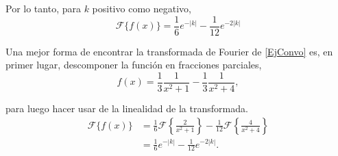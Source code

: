 \begin{ejemplo}
Por lo tanto, para $k$ positivo como negativo,
$$\boxed{\mathcal{F}\{f(x)\} =  \frac{1}{6} e^{-|k|} - \frac{1}{12} e^{-2|k|}} $$

Una mejor forma de encontrar la transformada de Fourier de \eqref{EjConvo} es, en primer lugar, descomponer la función en fracciones parciales,
$$f(x) = \frac{1}{3} \frac{1}{x^2+1} - \frac{1}{3} \frac{1}{x^2+4},$$

para luego hacer usar de la linealidad de la transformada.
\begin{align*}
     \mathcal{F}\{ f(x)\} &= \frac{1}{6} \mathcal{F} \left\{ \frac{2}{x^2+1}\right\} - \frac{1}{12} \mathcal{F} \left\{ \frac{4}{x^2+4} \right\}  \\
     &= \frac{1}{6} e^{-|k|} - \frac{1}{12} e^{-2|k|}.
\end{align*}

\end{ejemplo}








    


